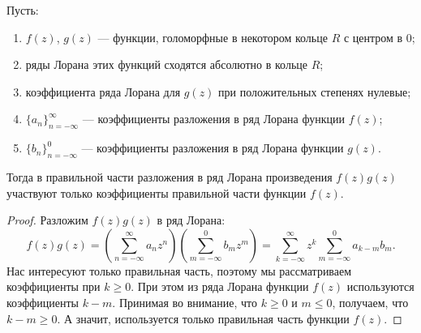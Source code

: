\documentclass[../paper.tex]{subfiles}
\begin{document}
\begin{Lem}
\label{product-series}
Пусть:
\begin{enumerate}
	\item $f(z)$, $g(z)$ --- функции, голоморфные в некотором кольце $R$ с центром в $0$;
	\item ряды Лорана этих функций сходятся абсолютно в кольце $R$;
	\item коэффициента ряда Лорана для $g(z)$ при положительных степенях нулевые;
	\item $\{a_n\}_{n=-\infty}^\infty$ --- коэффициенты разложения в ряд Лорана функции $f(z)$;
	\item $\{b_n\}_{n=-\infty}^{0}$ --- коэффициенты разложения в ряд Лорана функции $g(z)$.
\end{enumerate}

Тогда в правильной части разложения в ряд Лорана произведения $f(z)g(z)$ участвуют только коэффициенты правильной части функции $f(z)$.
\end{Lem}
\begin{proof}
Разложим $f(z)g(z)$ в ряд Лорана:
\[
	f(z)g(z)
	= \left(\sum_{n=-\infty}^{\infty} a_n z^n\right)
		\left(\sum_{m=-\infty}^{0} b_m z^m\right)
	= \sum_{k=-\infty}^{\infty} z^k \sum_{m=-\infty}^{0} a_{k-m} b_m
.\]
Нас интересуют только правильная часть, поэтому мы рассматриваем коэффициенты при $k \geqslant 0$.
При этом из ряда Лорана функции $f(z)$ используются коэффициенты $k-m$.
Принимая во внимание, что $k \geqslant 0$ и $m \leqslant 0$, получаем, что $k - m \geqslant 0$.
А значит, используется только правильная часть функции $f(z)$.
\end{proof}
\end{document}
